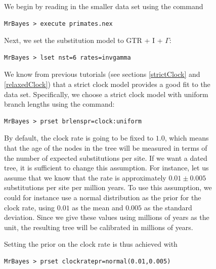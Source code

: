 \documentclass[12pt]{book}
\begin{document}
\begin{figure}[h]
We begin by reading in the smaller data set using the command

\small
\begin{singlespacing}
\begin{verbatim}
MrBayes > execute primates.nex
\end{verbatim}
\end{singlespacing}
\normalsize

Next, we set the substitution model to GTR + I + $\Gamma$:

\small
\begin{singlespacing}
\begin{verbatim}
MrBayes > lset nst=6 rates=invgamma
\end{verbatim}
\end{singlespacing}
\normalsize

We know from previous tutorials (see sections \ref{strictClock} and \ref{relaxedClock}) that a
strict clock model provides a good fit to the data set. Specifically, we choose a strict clock
model with uniform branch lengths using the command:

\small
\begin{singlespacing}
\begin{verbatim}
MrBayes > prset brlenspr=clock:uniform
\end{verbatim}
\end{singlespacing}
\normalsize

By default, the clock rate is going to be fixed to $1.0$, which means that the age of the nodes in
the tree will be measured in terms of the number of expected substitutions per site. If we want a
dated tree, it is sufficient to change this assumption. For instance, let us assume that we know
that the rate is approximately $0.01 \pm 0.005$ substitutions per site per million years. To use
this assumption, we could for instance use a normal distribution as the prior for the clock rate,
using $0.01$ as the mean and $0.005$ as the standard deviation. Since we give these values using
millions of years as the unit, the resulting tree will be calibrated in millions of years.

Setting the prior on the clock rate is thus achieved with

\small
\begin{singlespacing}
\begin{verbatim}
MrBayes > prset clockratepr=normal(0.01,0.005)
\end{verbatim}
\end{singlespacing}
\normalsize


\end{figure}
\end{document}
